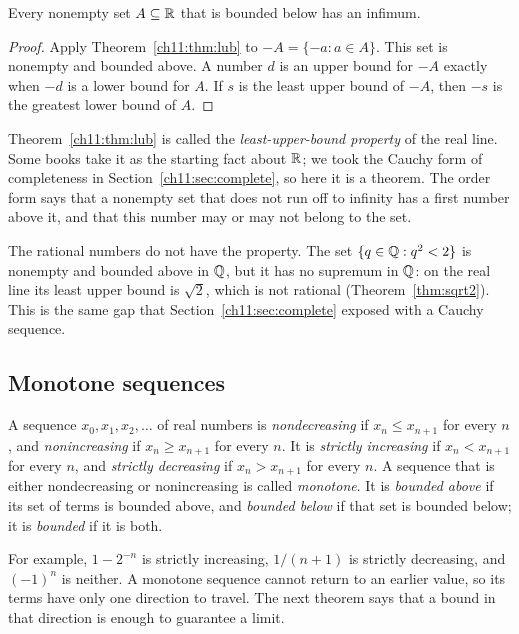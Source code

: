 \par\noindent\begin{minipage}{\linewidth}
\begin{corollary}\label{ch11:cor:glb}
Every nonempty set $A\subseteq\mathbb R$ that is bounded below has an infimum.
\end{corollary}
\end{minipage}\par

\begin{proof}
Apply Theorem~\ref{ch11:thm:lub} to $-A=\{-a:a\in A\}$. This set is nonempty and bounded above. A number $d$ is an upper bound for $-A$ exactly when $-d$ is a lower bound for $A$. If $s$ is the least upper bound of $-A$, then $-s$ is the greatest lower bound of $A$.
\end{proof}

Theorem~\ref{ch11:thm:lub} is called the \emph{least-upper-bound property} of the real line. Some books take it as the starting fact about $\mathbb R$; we took the Cauchy form of completeness in Section~\ref{ch11:sec:complete}, so here it is a theorem. The order form says that a nonempty set that does not run off to infinity has a first number above it, and that this number may or may not belong to the set.

The rational numbers do not have the property. The set $\{q\in\mathbb Q:q^2<2\}$ is nonempty and bounded above in $\mathbb Q$, but it has no supremum in $\mathbb Q$: on the real line its least upper bound is $\sqrt2$, which is not rational (Theorem~\ref{thm:sqrt2}). This is the same gap that Section~\ref{ch11:sec:complete} exposed with a Cauchy sequence.

\subsection*{Monotone sequences}
A sequence $x_0,x_1,x_2,\ldots$ of real numbers is \emph{nondecreasing} if $x_n\le x_{n+1}$ for every $n$, and \emph{nonincreasing} if $x_n\ge x_{n+1}$ for every $n$. It is \emph{strictly increasing} if $x_n<x_{n+1}$ for every $n$, and \emph{strictly decreasing} if $x_n>x_{n+1}$ for every $n$. A sequence that is either nondecreasing or nonincreasing is called \emph{monotone}. It is \emph{bounded above} if its set of terms is bounded above, and \emph{bounded below} if that set is bounded below; it is \emph{bounded} if it is both.

For example, $1-2^{-n}$ is strictly increasing, $1/(n+1)$ is strictly decreasing, and $(-1)^n$ is neither. A monotone sequence cannot return to an earlier value, so its terms have only one direction to travel. The next theorem says that a bound in that direction is enough to guarantee a limit.

